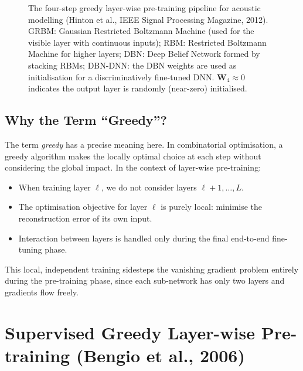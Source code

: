 \documentclass[12pt,a4paper]{article}
\newcommand{\W}{\mathbf{W}}
\begin{document}
\begin{figure}[ht]
\caption{The four-step greedy layer-wise pre-training pipeline for
acoustic modelling (Hinton et al., IEEE Signal Processing Magazine, 2012).
GRBM: Gaussian Restricted Boltzmann Machine (used for the visible layer with
continuous inputs); RBM: Restricted Boltzmann Machine for higher layers;
DBN: Deep Belief Network formed by stacking RBMs; DBN-DNN: the DBN weights
are used as initialisation for a discriminatively fine-tuned DNN.
$\W_4 \approx 0$ indicates the output layer is randomly (near-zero) initialised.}
\label{fig:dbn-pipeline}
\end{figure}

\subsection{Why the Term ``Greedy''?}

The term \emph{greedy} has a precise meaning here.  In combinatorial
optimisation, a greedy algorithm makes the locally optimal choice at each
step without considering the global impact.  In the context of layer-wise
pre-training:

\begin{itemize}[leftmargin=*]
  \item When training layer $\ell$, we do not consider layers $\ell+1, \ldots, L$.
  \item The optimisation objective for layer $\ell$ is purely local: minimise
        the reconstruction error of its own input.
  \item Interaction between layers is handled only during the final
        end-to-end fine-tuning phase.
\end{itemize}

This local, independent training sidesteps the vanishing gradient problem
entirely during the pre-training phase, since each sub-network has only two
layers and gradients flow freely.

\newpage

\section{Supervised Greedy Layer-wise Pre-training (Bengio et al., 2006)}
\label{sec:sup}
\end{document}
